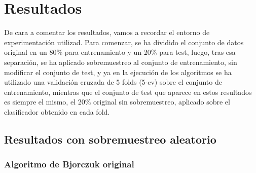 \section{Resultados} \label{resultados}

De cara a comentar los resultados, vamos a recordar el entorno de experimentación utilizad. Para comenzar, se ha dividido el conjunto de datos original en un 80\% para entrenamiento y un 20\% para test, luego, tras esa separación, se ha aplicado sobremuestreo al conjunto de entrenamiento, sin modificar el conjunto de test, y ya en la ejecución de los algoritmos se ha utilizado una validación cruzada de 5 folds (5-cv) sobre el conjunto de entrenamiento, mientras que el conjunto de test que aparece en estos resultados es siempre el mismo, el 20\% original sin sobremuestreo, aplicado sobre el clasificador obtenido en cada fold.

\subsection{Resultados con sobremuestreo aleatorio}


\subsubsection{Algoritmo de Bjorczuk original}


